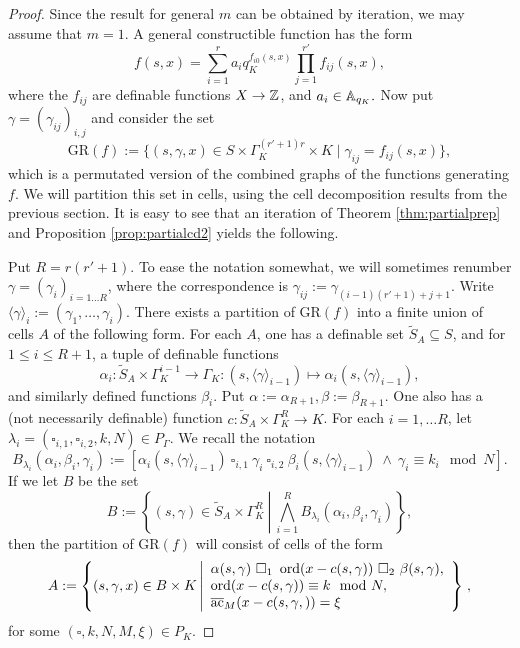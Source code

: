 \begin{proof}
Since the result for general $m$ can be obtained by iteration, we may assume that $m =1$. A general constructible function has the form
\[f(s,x) = \sum_{i=1}^r a_i q_K^{f_{i0}(s,x)} \prod_{j=1}^{r'}f_{ij}(s,x),\]
where the $f_{ij}$ are definable functions $X \to \ZZ$, and $a_i \in \AA_{q_K}.$
Now put $\gamma = (\gamma_{ij})_{i,j}$ and consider the set
\[\text{GR}(f):= \{(s,\gamma, x)\in S\times \Gamma_K^{(r'+1)r}\times K \mid  \gamma_{ij} = f_{ij}(s,x)\},\]
which is a permutated version of the combined graphs of the functions generating $f$. We will partition this set in cells, using the cell decomposition results from the previous section. It is easy to see that an iteration of Theorem \ref{thm:partialprep} and Proposition \ref{prop:partialcd2} yields the following.

Put $R = r(r'+1)$. To ease the notation somewhat, we will sometimes renumber $\gamma =(\gamma_i)_{i=1\ldots R}$, where the correspondence is $\gamma_{ij}:= \gamma_{(i-1)(r'+1)+j+1}$.
Write $\langle \gamma\rangle_i := (\gamma_1, \ldots, \gamma_{i})$.
There exists a partition of $\text{GR}(f)$ into a finite union of cells $A$ of the following form. 
For each $A$, one has a definable set $\tilde{S}_A \subseteq S$, and for $1 \leqslant i \leqslant R+1$, a tuple of definable functions
\[\alpha_i: \tilde{S}_A \times \Gamma_K^{i-1} \to \Gamma_K: (s, \langle \gamma\rangle_{i-1}) \mapsto \alpha_i(s, \langle \gamma\rangle_{i-1}),\]
and similarly defined functions $\beta_i$. Put $\alpha := \alpha_{R+1}, \beta:= \beta_{R+1}$.  One also has a (not necessarily definable) function $c: \tilde{S}_A \times \Gamma_K^{R}\to K$.
For each $i =1, \ldots R$, let $\lambda_i =(\square_{i,1}, \square_{i,2},k,N) \in P_{\Gamma}$. We recall the notation 
\[
B_{\lambda_i}(\alpha_i,\beta_i,\gamma_i):=  [\alpha_i(s,\langle \gamma\rangle_{i-1})\ \square_{i,1} \ \gamma_i \ \square_{i,2} \ \beta_i(s,\langle \gamma\rangle_{i-1}) \ \wedge \
 \gamma_i \equiv k_i\mod N] .
\]
If we let $B$ be the set \[
B:= \left\{(s,\gamma) \in \tilde{S}_A \times \Gamma_K^R \ \left| \ \bigwedge_{i=1}^R B_{\lambda_i}(\alpha_i,\beta_i,\gamma_i)\right\}\right.,\]
then the partition of $\text{GR}(f)$ will consist of cells of the form
\[A:=\left\{(s, \gamma, x) \in B \times K \left| \begin{array}{l} 
\alpha(s,\gamma) \ \square_{1}\ \ord(x -c(s,\gamma)) \ \square_{2}\ \beta(s, \gamma),\\
\ord(x -c(s,\gamma)) \equiv k \mod N,\\ \ac_M(x -c(s,\gamma, )) = \xi
\end{array}
\right\}\right.,\]
for some $(\square, k, N, M, \xi) \in P_K$.


\end{proof}
